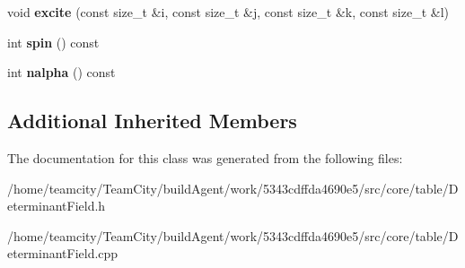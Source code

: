 \begin{DoxyCompactItemize}
\item 
void {\bfseries excite} (const size\+\_\+t \&i, const size\+\_\+t \&j, const size\+\_\+t \&k, const size\+\_\+t \&l)\hypertarget{classDeterminantElement_a73bef3958f537648c40bebbda88f36e7}{}\label{classDeterminantElement_a73bef3958f537648c40bebbda88f36e7}

\item 
int {\bfseries spin} () const \hypertarget{classDeterminantElement_a86954e3d0482cd3d0d2af545d630272c}{}\label{classDeterminantElement_a86954e3d0482cd3d0d2af545d630272c}

\item 
int {\bfseries nalpha} () const \hypertarget{classDeterminantElement_a772391a2a03e5cf5f2af76d4477c625e}{}\label{classDeterminantElement_a772391a2a03e5cf5f2af76d4477c625e}

\end{DoxyCompactItemize}
\subsection*{Additional Inherited Members}


The documentation for this class was generated from the following files\+:\begin{DoxyCompactItemize}
\item 
/home/teamcity/\+Team\+City/build\+Agent/work/5343cdffda4690e5/src/core/table/Determinant\+Field.\+h\item 
/home/teamcity/\+Team\+City/build\+Agent/work/5343cdffda4690e5/src/core/table/Determinant\+Field.\+cpp\end{DoxyCompactItemize}
